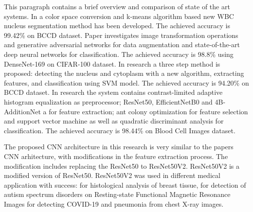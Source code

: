 This paragraph contains a brief overview and comparison of state of the art systems.  
In \cite{b19} a color space conversion and k-means algorithm based new WBC nucleus segmentation method has been developed. The achieved accuracy is 99.42\% on BCCD dataset.
Paper \cite{b20} investigates image transformation operations and generative adversarial networks for data augmentation and state-of-the-art deep neural networks for classification. The achieved accuracy is 98.8\% using DenseNet-169 on CIFAR-100 dataset.
In \cite{b21} research a three step method is proposed: detecting the nucleus and cytoplasm with a new algorithm, extracting features, and classification using SVM model. The achieved accuracy is 94.20\% on BCCD dataset.
In \cite{b5} research the system contains contrast-limited adaptive histogram equalization as preprocessor; ResNet50, EfficientNetB0 and 4B-AdditionNet a for feature extraction; 
ant colony optimization for feature selection and support vector machine as well as quadratic discriminant analysis for classification. The achieved accuracy is 98.44\% on Blood Cell Images dataset.

The proposed CNN architecture in this research is very similar to the \cite{b5} papers CNN arhitecture, with modifications in the feature extraction process. 
The modification includes replacing the ResNet50 to ResNet50V2. ResNet50V2 is a modified version of ResNet50. ResNet50V2 was used in different medical application with success: 
\cite{b22} for histological analysis of breast tissue, \cite{b23} for detection of autism spectrum disorders on Resting-state Functional Magnetic Resonance Images 
\cite{b6} for detecting COVID-19 and pneumonia from chest X-ray images.
 






